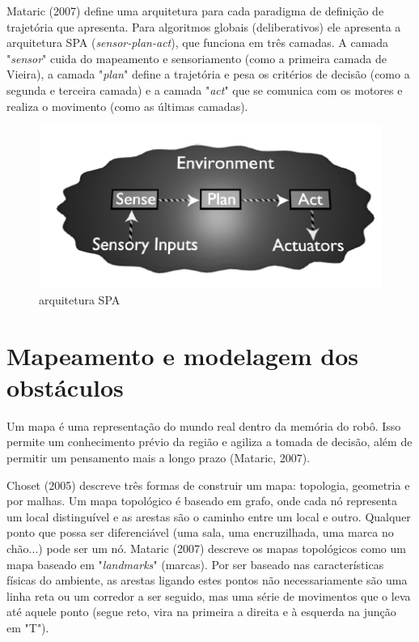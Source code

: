 Mataric (2007) define uma arquitetura para cada paradigma de definição de trajetória que apresenta. Para algoritmos globais (deliberativos) ele apresenta a arquitetura SPA (\textit{sensor-plan-act}), que funciona em três camadas. A camada "\textit{sensor}" cuida do mapeamento e sensoriamento (como a primeira camada de Vieira), a camada "\textit{plan}" define a trajetória e pesa os critérios de decisão (como a segunda e terceira camada) e a camada "\textit{act}" que se comunica com os motores e realiza o movimento (como as últimas camadas).

\begin{figure}[h]
	\centering
	\label{fig05}
		\includegraphics[keepaspectratio=true,scale=0.6]{figuras/6arquiteturaSPA.png}
	\caption{arquitetura SPA}
\end{figure}

\section{Mapeamento e modelagem dos obstáculos}

Um mapa é uma representação do mundo real dentro da memória do robô. Isso permite um conhecimento prévio da região e agiliza a tomada de decisão, além de permitir um pensamento mais a longo prazo (Mataric, 2007). 

Choset (2005) descreve três formas de construir um mapa: topologia, geometria e por malhas. Um mapa topológico é baseado em grafo, onde cada nó representa um local distinguível e as arestas são o caminho entre um local e outro. Qualquer ponto que possa ser diferenciável (uma sala, uma encruzilhada, uma marca no chão...) pode ser um nó. Mataric (2007) descreve os mapas topológicos como um mapa baseado em "\textit{landmarks}" (marcas). Por ser baseado nas características físicas do ambiente, as arestas ligando estes pontos não necessariamente são uma linha reta ou um corredor a ser seguido, mas uma série de movimentos que o leva até aquele ponto (segue reto, vira na primeira a direita e à esquerda na junção em "T").

